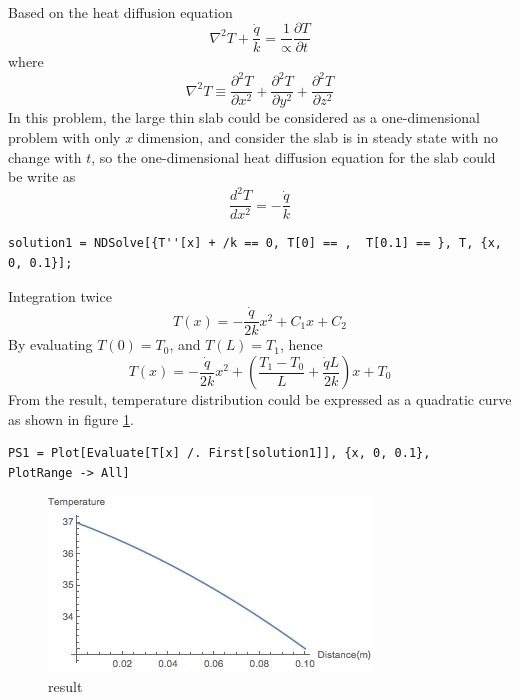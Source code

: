 \begin{solution}
~\\
Based on the heat diffusion equation 
$$\nabla^2 T+\frac{\dot{q}}{k}=\frac{1}{\propto}\frac{\partial T}{\partial t}$$
where
$$\nabla^2 T \equiv \frac{\partial^2 T}{\partial x^2}+
\frac{\partial^2 T}{\partial y^2}+
\frac{\partial^2 T}{\partial z^2}$$
In this problem, the large thin slab could be considered as a one-dimensional problem 
with only $x$ dimension, and consider the slab is in steady state with no change with $t$,
so the one-dimensional heat diffusion equation for the slab could be write as
$$\frac{d^2 T}{d x^2}=-\frac{\dot{q}}{k}$$
\begin{lstlisting}
solution1 = NDSolve[{T''[x] + /k == 0, T[0] == ,  T[0.1] == }, T, {x, 0, 0.1}];
\end{lstlisting}
Integration twice
$$T(x)=-\frac{\dot{q}}{2k}x^2+C_1x+C_2$$
By evaluating $T(0)=T_0$, and $T(L)=T_1$, hence
$$T(x)=-\frac{\dot{q}}{2k}x^2+ \left(\frac{T_1-T_0}{L}+\frac{\dot{q}L}{2k}\right)x+T_0$$
From the result, temperature distribution could be expressed as a quadratic curve as shown in
figure \ref{fig:2:7}.
\begin{lstlisting}
PS1 = Plot[Evaluate[T[x] /. First[solution1]], {x, 0, 0.1},    PlotRange -> All]
\end{lstlisting}
\begin{figure}[H]
  \centering
    \includegraphics[scale=0.8]{figures/ch2/7}
    \caption{result}
    \label{fig:2:7}
\end{figure}
\end{solution}

